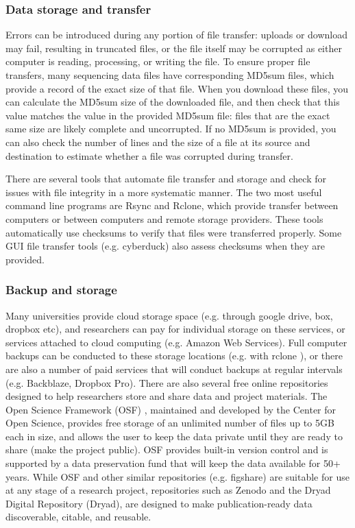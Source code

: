 \documentclass[10pt,letterpaper]{article}
\begin{document}
\subsubsection*{Data storage and transfer}

Errors can be introduced during any portion of file transfer: uploads or download may fail, resulting in truncated files, or the file itself may be corrupted as either computer is reading, processing, or writing the file. 
To ensure proper file transfers, many sequencing data files have corresponding MD5sum files, which provide a record of the exact size of that file.
When you download these files, you can calculate the MD5sum size of the downloaded file, and then check that this value matches the value in the provided MD5sum file: files that are the exact same size are likely complete and uncorrupted. 
If no MD5sum is provided, you can also check the number of lines and the size of a file at its source and destination to estimate whether a file was corrupted during transfer.

There are several tools that automate file transfer and storage and check for issues with file integrity in a more systematic manner. 
The two most useful command line programs are Rsync and Rclone, which provide transfer between computers or between computers and remote storage providers. 
These tools automatically use checksums to verify that files were transferred properly.
Some GUI file transfer tools (e.g. cyberduck) also assess checksums when they are provided.

\subsubsection*{Backup and storage} 
Many universities provide cloud storage space (e.g. through google drive, box, dropbox etc), and researchers can pay for individual storage on these services, or services attached to cloud computing (e.g. Amazon Web Services). 
Full computer backups can be conducted to these storage locations (e.g. with rclone \cite{bailleul2016rclone}), or there are also a number of paid services that will conduct backups at regular intervals (e.g. Backblaze, Dropbox Pro). 
There are also several free online repositories designed to help researchers store and share data and project materials. 
The Open Science Framework (OSF) \cite{foster2017open}, maintained and developed by the Center for Open Science, provides free storage of an unlimited number of files up to 5GB each in size, and allows the user to keep the data private until they are ready to share (make the project public). 
OSF provides built-in version control and is supported by a data preservation fund that will keep the data available for 50+ years. 
While OSF and other similar repositories (e.g. figshare) are suitable for use at any stage of a research project, repositories such as Zenodo and the Dryad Digital Repository (Dryad), are designed to make publication-ready data discoverable, citable, and reusable. 
\end{document}
